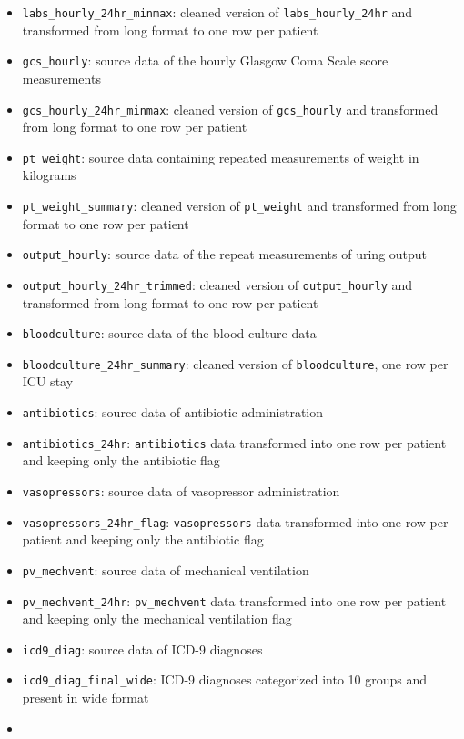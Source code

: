 \documentclass[
]{article}
\begin{document}
\begin{itemize}
\item
  \texttt{labs\_hourly\_24hr\_minmax}: cleaned version of
  \texttt{labs\_hourly\_24hr} and transformed from long format to one
  row per patient
\item
  \texttt{gcs\_hourly}: source data of the hourly Glasgow Coma Scale
  score measurements
\item
  \texttt{gcs\_hourly\_24hr\_minmax}: cleaned version of
  \texttt{gcs\_hourly} and transformed from long format to one row per
  patient
\item
  \texttt{pt\_weight}: source data containing repeated measurements of
  weight in kilograms
\item
  \texttt{pt\_weight\_summary}: cleaned version of \texttt{pt\_weight}
  and transformed from long format to one row per patient
\item
  \texttt{output\_hourly}: source data of the repeat measurements of
  uring output
\item
  \texttt{output\_hourly\_24hr\_trimmed}: cleaned version of
  \texttt{output\_hourly} and transformed from long format to one row
  per patient
\item
  \texttt{bloodculture}: source data of the blood culture data
\item
  \texttt{bloodculture\_24hr\_summary}: cleaned version of
  \texttt{bloodculture}, one row per ICU stay
\item
  \texttt{antibiotics}: source data of antibiotic administration
\item
  \texttt{antibiotics\_24hr}: \texttt{antibiotics} data transformed into
  one row per patient and keeping only the antibiotic flag
\item
  \texttt{vasopressors}: source data of vasopressor administration
\item
  \texttt{vasopressors\_24hr\_flag}: \texttt{vasopressors} data
  transformed into one row per patient and keeping only the antibiotic
  flag
\item
  \texttt{pv\_mechvent}: source data of mechanical ventilation
\item
  \texttt{pv\_mechvent\_24hr}: \texttt{pv\_mechvent} data transformed
  into one row per patient and keeping only the mechanical ventilation
  flag
\item
  \texttt{icd9\_diag}: source data of ICD-9 diagnoses
\item
  \texttt{icd9\_diag\_final\_wide}: ICD-9 diagnoses categorized into 10
  groups and present in wide format
\item

\end{itemize}
\end{document}
